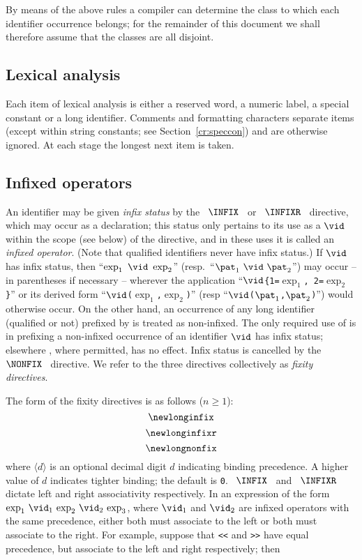 By means of the above rules a compiler can determine the class to which each
identifier occurrence belongs; for the remainder of this document we shall
therefore assume that the classes are all disjoint.

\subsection{Lexical analysis}
Each item of lexical analysis is either a reserved word, a numeric label, a
special constant or a long identifier.
Comments and formatting characters
separate items (except within string constants; see Section~\ref{cr:speccon})
and are otherwise
ignored.   At each stage the longest next item is taken.

\subsection{Infixed operators}
\label{infop.sec}
An identifier may be given {\sl infix status} by the
~$\INFIX$~ or ~$\INFIXR$~ directive, which may occur as a
declaration; this status only pertains to its use as a
$\vid$ within the scope (see below) of the
directive, and in these uses it is called an {\sl infixed operator}.
(Note that qualified identifiers never have infix status.)  If
$\vid$
has infix status, then ``$\exp_1\ \vid\ \exp_2$''
(resp.\ ``$\pat_1\ \vid\ \pat_2$'') may occur -- in parentheses if necessary -- wherever
the application ``$\vid$\verb+{+{\tt 1=}$\exp_1$\verb+,+{\tt
2=}$\exp_2$\verb+}+'' or its derived form
``$\vid$\verb+(+$\exp_1$\verb+,+$\exp_2$\verb+)+'' (resp
``$\vid$\verb+(+$\pat_1$\verb+,+$\pat_2$\verb+)+'') would otherwise
occur.  On the other hand, an occurrence of any long identifier (qualified
or not) prefixed by {\OP} is treated as non-infixed. The only required
use of {\OP} is in prefixing a non-infixed occurrence of an
identifier $\vid$  has infix status; elsewhere {\OP}, where
permitted, has no effect.
Infix status is cancelled by the ~$\NONFIX$~
directive.  We refer to the three directives collectively as {\sl fixity directives}.

The form of the fixity directives is as follows ($n\geq 1$):
\[ \newlonginfix \]
\[ \newlonginfixr \]
\[ \newlongnonfix \] where $\langle d\rangle$ is an optional decimal digit $d$ indicating
binding precedence. A higher value of $d$ indicates tighter binding;
the default is {\tt 0}. ~$\INFIX$~ and ~$\INFIXR$~ dictate left and right
associativity respectively. In an expression of the form  $\exp_1\, \vid_1\, \exp_2\, \vid_2\, \exp_3$, where
      $\vid_1$ and $\vid_2$ are infixed operators with the same precedence,
      either both must associate to the left or both must
associate to the right.
For example, suppose that {\tt <<} and {\tt >>} have equal precedence,
but associate to the left and right respectively; then
\medskip

